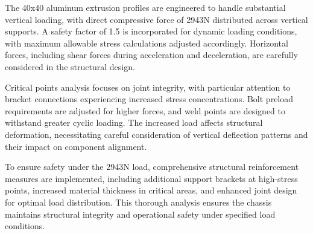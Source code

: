 \documentclass[../../main]{subfiles}
\begin{document}
The 40x40 aluminum extrusion profiles are engineered to handle
substantial vertical loading, with direct compressive force of 2943N
distributed across vertical supports. A safety factor of 1.5 is
incorporated for dynamic loading conditions, with maximum allowable
stress calculations adjusted accordingly. Horizontal forces, including
shear forces during acceleration and deceleration, are carefully
considered in the structural design.

Critical points analysis focuses on joint integrity, with particular
attention to bracket connections experiencing increased stress
concentrations. Bolt preload requirements are adjusted for higher
forces, and weld points are designed to withstand greater cyclic
loading. The increased load affects structural deformation,
necessitating careful consideration of vertical deflection patterns and
their impact on component alignment.

To ensure safety under the 2943N load, comprehensive structural
reinforcement measures are implemented, including additional support
brackets at high-stress points, increased material thickness in critical
areas, and enhanced joint design for optimal load distribution. This
thorough analysis ensures the chassis maintains structural integrity and
operational safety under specified load conditions.
\end{document}
